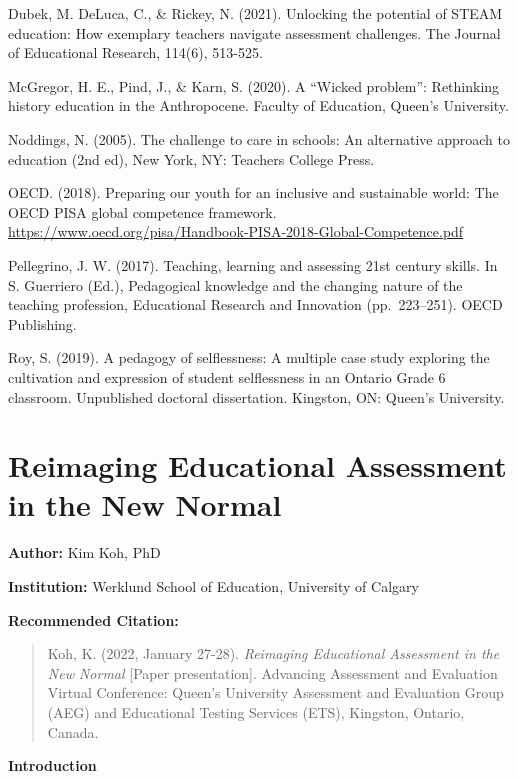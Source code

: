 \documentclass[
]{book}
\begin{document}
Dubek, M. DeLuca, C., \& Rickey, N. (2021). Unlocking the potential of STEAM education: How exemplary teachers navigate assessment challenges. The Journal of Educational Research, 114(6), 513-525.

McGregor, H. E., Pind, J., \& Karn, S. (2020). A ``Wicked problem'': Rethinking history education in the Anthropocene. Faculty of Education, Queen's University.

Noddings, N. (2005). The challenge to care in schools: An alternative approach to education (2nd ed), New York, NY: Teachers College Press.

OECD. (2018). Preparing our youth for an inclusive and sustainable world: The OECD PISA global competence framework. \url{https://www.oecd.org/pisa/Handbook-PISA-2018-Global-Competence.pdf}

Pellegrino, J. W. (2017). Teaching, learning and assessing 21st century skills. In S. Guerriero (Ed.), Pedagogical knowledge and the changing nature of the teaching profession, Educational Research and Innovation (pp.~223--251). OECD Publishing.

Roy, S. (2019). A pedagogy of selflessness: A multiple case study exploring the cultivation and expression of student selflessness in an Ontario Grade 6 classroom. Unpublished doctoral dissertation. Kingston, ON: Queen's University.

\newpage

\hypertarget{reimaging-educational-assessment-in-the-new-normal}{%
\section{Reimaging Educational Assessment in the New Normal}\label{reimaging-educational-assessment-in-the-new-normal}}

\textbf{Author:} Kim Koh, PhD

\textbf{Institution:} Werklund School of Education, University of Calgary

\textbf{Recommended Citation:}

\begin{quote}
Koh, K. (2022, January 27-28). \emph{Reimaging Educational Assessment in the New Normal} {[}Paper presentation{]}. Advancing Assessment and Evaluation Virtual Conference: Queen's University Assessment and Evaluation Group (AEG) and Educational Testing Services (ETS), Kingston, Ontario, Canada.
\end{quote}

\textbf{Introduction}
\end{document}

